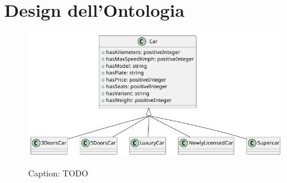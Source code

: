 \chapter{Design dell'Ontologia}

\begin{figure}[H]
    \caption{Caption: TODO}
    \includegraphics[width=\textwidth]{figures/carpedia-car.png}
    \label{fig:carpedia-car}
\end{figure}

